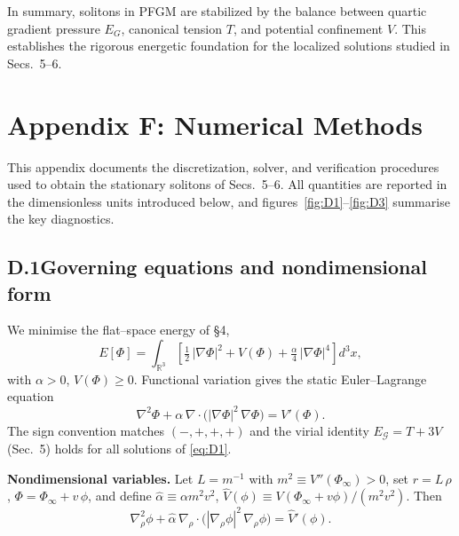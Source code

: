 \documentclass{article}
\begin{document}
In summary, solitons in PFGM are stabilized by the balance between quartic gradient pressure $E_G$, canonical tension $T$, and potential confinement $V$. This establishes the rigorous energetic foundation for the localized solutions studied in Secs.~5--6.



\section*{Appendix F: Numerical Methods}
\label{app:numerics}

This appendix documents the discretization, solver, and verification procedures used to obtain the stationary solitons of Secs.~5–6. All quantities are reported in the dimensionless units introduced below, and figures~\ref{fig:D1}–\ref{fig:D3} summarise the key diagnostics.

\setcounter{equation}{0}
\renewcommand{\theequation}{D.\arabic{equation}}

\subsection*{D.1\;\;Governing equations and nondimensional form}

We minimise the flat–space energy of §4,
\begin{equation}
E[\Phi]=\int_{\mathbb{R}^3}\!\left[\tfrac12\,|\nabla\Phi|^2+V(\Phi)+\tfrac{\alpha}{4}\,|\nabla\Phi|^4\right]d^3x,
\end{equation}
with $\alpha>0$, $V(\Phi)\ge0$. Functional variation gives the static Euler–Lagrange equation
\begin{equation}
\nabla^2\Phi+\alpha\,\nabla\!\cdot\!\big(|\nabla\Phi|^2\,\nabla\Phi\big)=V'(\Phi).
\label{eq:D1}
\end{equation}
The sign convention matches $(-,+,+,+)$ and the virial identity $E_{\mathcal G}=T+3V$ (Sec.~5) holds for all solutions of \eqref{eq:D1}.

\textbf{Nondimensional variables.}
Let $L=m^{-1}$ with $m^2\equiv V''(\Phi_\infty)>0$, set $r=L\,\rho$, $\Phi=\Phi_\infty+v\,\phi$, and define
$\hat{\alpha}\equiv\alpha m^2 v^2$, $\widehat{V}(\phi)\equiv V(\Phi_\infty+v\phi)/(m^2 v^2)$. Then
\begin{equation}
\nabla^2_{\!\rho}\phi+\hat{\alpha}\,\nabla_{\!\rho}\!\cdot\!\big(|\nabla_{\!\rho}\phi|^2\,\nabla_{\!\rho}\phi\big)=\widehat{V}'(\phi).
\label{eq:D2}
\end{equation}
\end{document}
